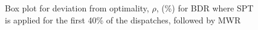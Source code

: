 \documentclass[smallextended]{svjour3}
\begin{document}
\begin{figure}
\centering
{}%
\caption{Box plot for deviation from optimality, $\rho$, (\%) for BDR where SPT is applied for the first 40\% of the dispatches, followed by MWR}
\label{fig:boxplot:BDR}
\end{figure}

\begin{comment}
\subsection{Extremal feature}\label{sec:opt:ext}
The SDRs we've inspected so-far are based on two features from \cref{tbl:jssp:feat}, namely
\begin{itemize}
\item \phiproc\ for SPT and LPT 
\item \phiwrmJob\ for LWR and MWR 
\end{itemize}
by choosing the lowest value for the first SDR, and highest value for the latter SDR, i.e. the extremal values for those given features. Let's apply the same methodology from \cref{sec:opt:sdr} to all varying features\footnote{Note, \phistep, \phimac\ and \phiwrmTotal\ describe the features, not the schedule. For instance, \phistep\, gives us no new information, as that feature is homogeneous for each timestep, making it equivalent to random guessing.} described in \cref{tbl:jssp:feat}.  \Cref{fig:j.rnd:opt:minmax,fig:j.rndn:opt:minmax,fig:f.rnd:opt:minmax}
depict the probability of all extremal features being an optimal dispatch, with random guessing from \cref{fig:opt} as a dashed line. 

In order to put the extremal features into perspective, it's worth comparing them with how the evolution of the features are over time, depicted in \cref{fig:j.rnd:opt:evol,fig:j.rndn:opt:evol,fig:f.rnd:opt:evol}. 


\begin{figure}
\centering
\texttt{[image: figures/\{j.rnd]}/{trdat.feat.stepwise.10x10.OPT}.pdf}
\caption{Feature evolution of optimal trajectory for \jrnd{10}{10}}
\label{fig:j.rnd:opt:evol}
\end{figure}
\begin{figure}
\centering
\missingfigure{j.rndn}
\caption{Feature evolution of optimal trajectory for \jrndn{10}{10}}
\label{fig:j.rndn:opt:evol}
\end{figure}
\begin{figure}
\centering
\texttt{[image: figures/\{f.rnd]}/{trdat.feat.stepwise.10x10.OPT}.pdf}
\caption{Feature evolution of optimal trajectory for \frnd{10}{10}}
\label{fig:f.rnd:opt:evol}
\end{figure}


\end{comment}
\end{document}
